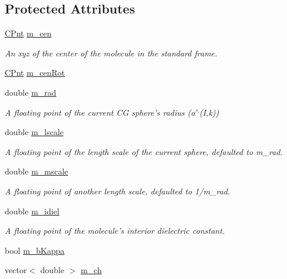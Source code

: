 \subsection*{Protected Attributes}
\begin{DoxyCompactItemize}
\item 
\hyperlink{classCPnt}{C\-Pnt} \hyperlink{classCExpCenter_a57a81c26f40939d189a88b82c77f16e8}{m\-\_\-cen}
\begin{DoxyCompactList}\small\item\em An xyz of the center of the molecule in the standard frame. \end{DoxyCompactList}\item 
\hyperlink{classCPnt}{C\-Pnt} \hyperlink{classCExpCenter_a73b0d497d54258b3ab503167ae6f7e75}{m\-\_\-cen\-Rot}
\item 
double \hyperlink{classCExpCenter_abc237f77679da4a21619a384e6ff4f6b}{m\-\_\-rad}
\begin{DoxyCompactList}\small\item\em A floating point of the current C\-G sphere's radius (a$^\wedge$(I,k)) \end{DoxyCompactList}\item 
double \hyperlink{classCExpCenter_aac9d9de905652a9d78115a1b53091bce}{m\-\_\-lscale}
\begin{DoxyCompactList}\small\item\em A floating point of the length scale of the current sphere, defaulted to m\-\_\-rad. \end{DoxyCompactList}\item 
double \hyperlink{classCExpCenter_a7182695f02cc43411ebc67e64258a2ec}{m\-\_\-mscale}
\begin{DoxyCompactList}\small\item\em A floating point of another length scale, defaulted to 1/m\-\_\-rad. \end{DoxyCompactList}\item 
double \hyperlink{classCExpCenter_a2ebe2d840aaaa9329706514fa6957efa}{m\-\_\-idiel}
\begin{DoxyCompactList}\small\item\em A floating point of the molecule's interior dielectric constant. \end{DoxyCompactList}\item 
bool \hyperlink{classCExpCenter_a9012e39bbe103cd93190156817b0efb4}{m\-\_\-b\-Kappa}
\item 
vector$<$ double $>$ \hyperlink{classCExpCenter_a834cd8238e3d5fd2b29a487d08f93978}{m\-\_\-ch}

\end{DoxyCompactItemize}
